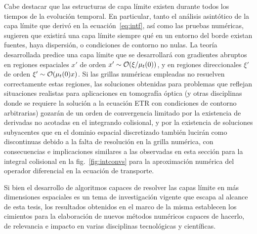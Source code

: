 Cabe destacar que las estructuras de capa límite 
existen durante todos los tiempos de la evolución temporal. 
En particular, tanto el análisis asintótico de la capa límite que 
derivó en la ecuación~\eqref{eq:intf}, 
así como las pruebas numéricas, sugieren que existirá una capa límite 
siempre qué en un entorno del borde existan fuentes, haya dispersión, 
o condiciones de contorno no nulas. La teoría desarrollada predice 
una capa límite que se desarrollará con gradientes abruptos en regiones 
espaciales $x'$ de orden $x'\sim \mathcal{O}(\xi/\mu_t(0))$, y en regiones direccionales $\xi'$  
de orden $\xi'\sim \mathcal{O}(\mu_t(0) x)$. Si las grillas numéricas empleadas no resuelven 
correctamente estas regiones, las soluciones obtenidas para problemas 
que reflejan situaciones realistas para aplicaciones en tomografía óptica 
(y otras disciplinas donde se requiere la solución a la ecuación ETR con 
condiciones de contorno arbitrarias) gozarán de un orden de convergencia 
limitado por la existencia de derivadas no acotadas en el integrando 
colisional, y por la existencia de soluciones subyacentes que en el dominio 
espacial discretizado también lucirán como discontinuas debido a la falta de resolución 
en la grilla numérica, 
con consecuencias e implicaciones similares a las observadas 
en esta sección para la integral colisional en la fig.~\ref{fig:intconvs} 
para la aproximación 
numérica del operador diferencial en la ecuación de transporte. 

Si bien el desarrollo de algoritmos capaces de resolver las capas límite 
en más dimensiones espaciales es un tema de investigación vigente que escapa 
al alcance de esta tesis, los resultados obtenidos en el marco de la misma 
establecen los cimientos para la elaboración de nuevos métodos numéricos 
capaces de hacerlo, de relevancia e impacto en varias disciplinas tecnológicas 
y científicas. 

\pagestyle{empty}


